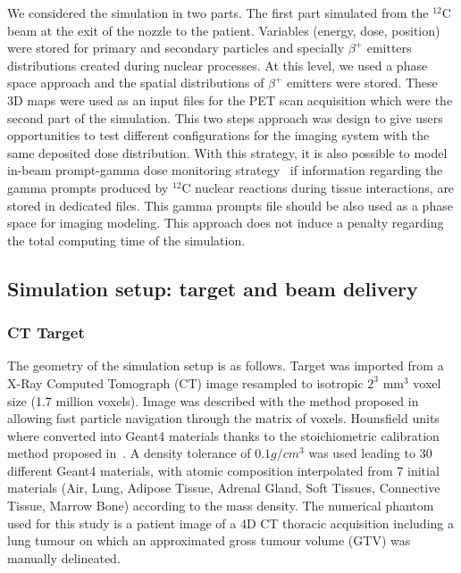 \documentclass[11pt]{iopart}
\begin{document}
We considered the simulation in two parts. The first part simulated
from the $^{12}$C beam at the exit of the nozzle to the
patient. Variables (energy, dose, position) were stored for primary
and secondary particles and specially $\beta^+$ emitters distributions
created during nuclear processes. At this level, we used a phase space
approach and the spatial distributions of $\beta^+$ emitters were
stored. These 3D maps were used as an input files for the PET scan
acquisition which were the second part of the simulation. This two
steps approach was design to give users opportunities to test
different configurations for the imaging system with the same
deposited dose distribution. With this strategy, it is also possible
to model in-beam prompt-gamma dose monitoring
strategy~\cite{Testa2008, Moteabbed2011} if information regarding the
gamma prompts produced by $^{12}$C nuclear reactions during tissue
interactions, are stored in dedicated files. This gamma prompts file
should be also used as a phase space for imaging modeling. This
approach does not induce a penalty regarding the total computing time
of the simulation.


\subsection{Simulation setup: target and beam delivery}

\subsubsection{CT Target}

The geometry of the simulation setup is as follows. Target was
imported from a X-Ray Computed Tomograph (CT) image resampled to
isotropic $2^3$ mm$^3$ voxel size (1.7 million voxels). Image was
described with the method proposed in~\cite{Sarrut2008} allowing fast
particle navigation through the matrix of voxels. Hounsfield units
where converted into Geant4 materials thanks to the stoichiometric
calibration method proposed in~\cite{Schneider2000a}. A density
tolerance of $0.1 g/cm^3$ was used leading to $30$ different Geant4
materials, with atomic composition interpolated from 7 initial
materials (Air, Lung, Adipose Tissue, Adrenal Gland, Soft Tissues,
Connective Tissue, Marrow Bone) according to the mass density. The
numerical phantom used for this study is a patient image of a 4D CT
thoracic acquisition including a lung tumour on which an approximated
gross tumour volume (GTV) was manually delineated.
\end{document}
